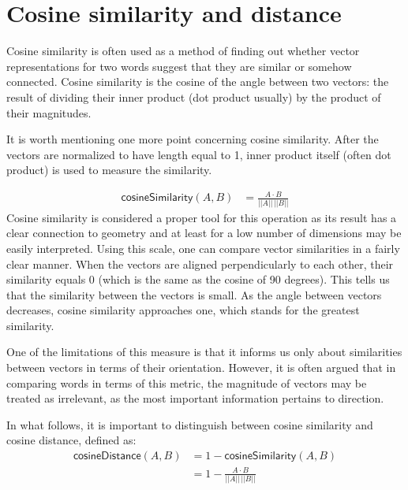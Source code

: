 \documentclass[
  12pt,
]{book}
\begin{document}
\hypertarget{cosine-similarity-and-distance}{%
\section{Cosine similarity and distance}\label{cosine-similarity-and-distance}}

Cosine similarity is often used as a method of finding out whether vector representations for two words suggest that they are similar or somehow connected. Cosine similarity is the cosine of the angle between two vectors: the result of dividing their inner product (dot product usually) by the product of their magnitudes.

It is worth mentioning one more point concerning cosine similarity. After the vectors are normalized to have length equal to 1, inner product itself (often dot product) is used to measure the similarity.

\begin{align} \tag{Sim}
\mathsf{cosineSimilarity}(A,B) & = \frac{A \cdot B}{\vert \vert A \vert \vert \,\vert \vert B \vert \vert}
\end{align}
Cosine similarity is considered a proper tool for this operation as its result has a clear connection to geometry and at least for a low number of dimensions may be easily interpreted. Using this scale, one can compare vector similarities in a fairly clear manner. When the vectors are aligned perpendicularly to each other, their similarity equals 0 (which is the same as the cosine of 90 degrees). This tells us that the similarity between the vectors is small. As the angle between vectors decreases, cosine similarity approaches one, which stands for the greatest similarity.

One of the limitations of this measure is that it informs us only about similarities between vectors in terms of their orientation. However, it is often argued that in comparing words in terms of this metric, the magnitude of vectors may be treated as irrelevant, as the most important information pertains to direction.

In what follows, it is important to distinguish between cosine similarity and cosine distance, defined as:
\begin{align} \tag{Sim}
\mathsf{cosineDistance}(A,B) &  = 1 - \mathsf{cosineSimilarity}(A,B)\\
 &  = 1 - \frac{A \cdot B}{\vert \vert A \vert \vert \,\vert \vert B \vert \vert} \nonumber
\end{align}
\end{document}
